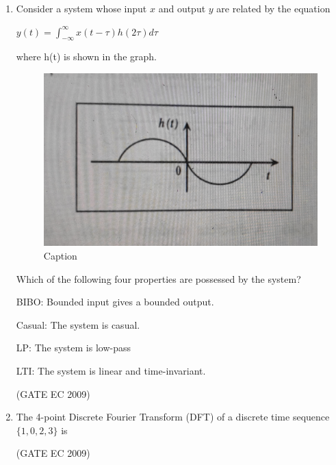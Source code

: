 \documentclass[journal,12pt,onecolumn]{IEEEtran}
\theoremstyle{remark}
\begin{document}
\begin{enumerate}[start=1, label={Q\arabic*.}]
\item Consider a system whose input $x$ and output $y$ are related by the equation 
\begin{center}
    $y(t)= \int_{-\infty}^{\infty} x(t-\tau)h(2\tau)d\tau$
\end{center}
where h(t) is shown in the graph.
\begin{figure}[H]
    \centering
    \includegraphics[width=0.5\linewidth]{images/img_18.jpg}
    \caption{Caption}
    \label{fig:placeholder}
\end{figure}

Which of the following four properties are possessed by the system?

BIBO: Bounded input gives a bounded output.

Casual: The system is casual.

LP: The system is low-pass

LTI: The system is linear and time-invariant.
\begin{enumerate}[label=(\Alph*)]
\end{enumerate}
\hfill (GATE EC 2009)

\item The 4-point Discrete Fourier Transform (DFT) of a discrete time sequence $\{1,0,2,3\}$ is 
\begin{enumerate}[label=(\Alph*)]
\end{enumerate}
\hfill (GATE EC 2009)


\end{enumerate}
\end{document}
